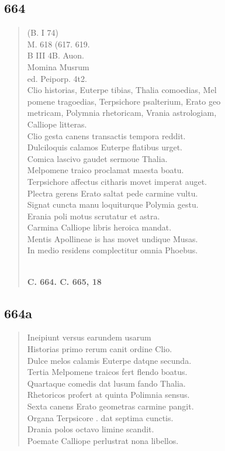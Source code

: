\documentclass[11pt, a4paper]{report}
\begin{document}
            \subsection*{664}
      \begin{verse}
      (B. I 74) \\ M. 618 (617. 619. \\ B III 4B. Auon. \\ Momina Musrum \\ ed. Peiporp. 4t2. \\  \lbrack Clio historias, Euterpe tibias, Thalia comoedias, Mel \\ pomene tragoedias, Terpsichore psalterium, Erato geo \\ metricam, Polymnia rhetoricam, Vrania astrologiam, \\ Calliope litteras. \rbrack  \\ Clio gesta canens transactis tempora reddit. \\ Dulciloquis calamos Euterpe flatibus urget. \\ Comica lascivo gaudet sermoue Thalia. \\ Melpomene traico proclamat maesta boatu. \\ Terpsichore affectus citharis movet imperat auget. \\ Plectra gerens Erato saltat pede carmine vultu. \\ Signat cuncta manu loquiturque Polymia gestu. \\ Erania poli motus scrutatur et astra. \\ Carmina Calliope libris heroica mandat. \\ Mentis Apollineae is has movet undique Musas. \\ In medio residens complectitur omnia Phoebus. \\ 
        ﻿\pagebreak 
    \begin{center} \textbf{C. 664. C. 665, 18} \end{center} \marginpar{[135]} 
      \end{verse}
  
            \subsection*{664a}
      \begin{verse}
      Ineipiunt versus earundem usarum \\ Historias primo rerum canit ordine Clio. \\ Dulce melos calamis Euterpe datqne secunda. \\ Tertia Melpomene traicos fert flendo boatus. \\ Quartaque comedis dat lusum fando Thalia. \\ Rhetoricos profert at quinta Polimnia sensus. \\ Sexta canens Erato geometras carmine pangit. \\ Organa Terpsicore . dat septima cunctis. \\ Drania polos octavo limine scandit. \\ Poemate Calliope perlustrat nona libellos. \\ 
      \end{verse}
  
\end{document}
